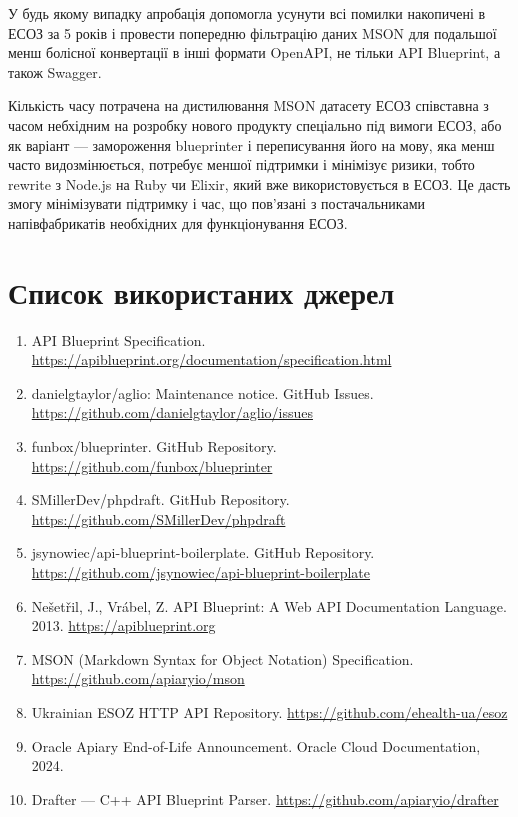 \documentclass{article}
\begin{document}
У будь якому випадку апробація допомогла усунути всі помилки накопичені в ЕСОЗ за 5 років і провести попередню фільтрацію даних MSON
для подальшої менш болісної конвертації в інші формати OpenAPI, не тільки API Blueprint, а також Swagger.

Кількість часу потрачена на дистилювання MSON датасету ЕСОЗ співставна з часом небхідним на розробку нового продукту спеціально під вимоги ЕСОЗ,
або як варіант — замороження blueprinter і переписування його на мову, яка менш часто видозмінюється, потребує меншої підтримки і мінімізує
ризики, тобто rewrite з Node.js на Ruby чи Elixir, який вже використовується в ЕСОЗ. Це дасть змогу мінімізувати підтримку і час, що пов'язані з постачальниками
напівфабрикатів необхідних для функціонування ЕСОЗ.

\section*{Список використаних джерел}
\begin{enumerate}
\item API Blueprint Specification. \url{https://apiblueprint.org/documentation/specification.html}
\item danielgtaylor/aglio: Maintenance notice. GitHub Issues. \url{https://github.com/danielgtaylor/aglio/issues}
\item funbox/blueprinter. GitHub Repository. \url{https://github.com/funbox/blueprinter}
\item SMillerDev/phpdraft. GitHub Repository. \url{https://github.com/SMillerDev/phpdraft}
\item jsynowiec/api-blueprint-boilerplate. GitHub Repository. \url{https://github.com/jsynowiec/api-blueprint-boilerplate}
\item Nešetřil, J., Vrábel, Z. API Blueprint: A Web API Documentation Language. 2013. \url{https://apiblueprint.org}
\item MSON (Markdown Syntax for Object Notation) Specification. \url{https://github.com/apiaryio/mson}
\item Ukrainian ESOZ HTTP API Repository. \url{https://github.com/ehealth-ua/esoz}
\item Oracle Apiary End-of-Life Announcement. Oracle Cloud Documentation, 2024.
\item Drafter — C++ API Blueprint Parser. \url{https://github.com/apiaryio/drafter}
\end{enumerate}
\end{document}
